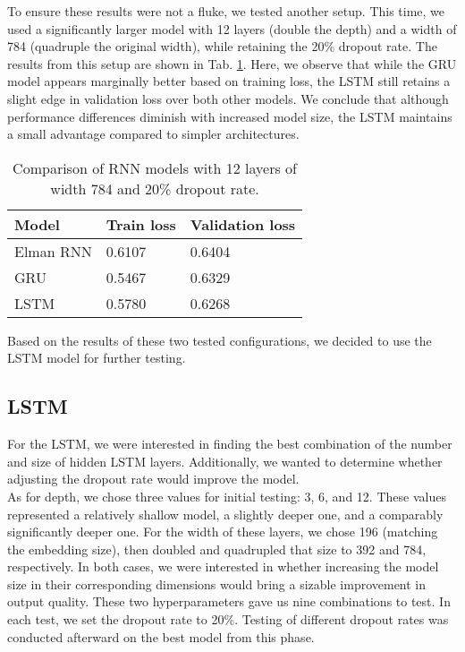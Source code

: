 To ensure these results were not a fluke, we tested another setup. This time, we used a significantly larger model with 12 layers (double the depth) and a width of 784 (quadruple the original width), while retaining the 20\% dropout rate. The results from this setup are shown in Tab. \ref{tab:rnn_comp_2}. Here, we observe that while the GRU model appears marginally better based on training loss, the LSTM still retains a slight edge in validation loss over both other models. We conclude that although performance differences diminish with increased model size, the LSTM maintains a small advantage compared to simpler architectures.
\\

\begin{table}[!h]
	\centering
	\begin{tabular}{|l|l|l|}
		\hline
		Model        & Train loss      & Validation loss \\ \hline
		Elman RNN    &  0.6107         & 0.6404          \\ \hline      
		GRU          &  0.5467         & 0.6329          \\ \hline           
		LSTM         &  0.5780         & 0.6268          \\ \hline
	\end{tabular}
	\caption{Comparison of RNN models with 12 layers of width 784 and 20\% dropout rate.}
	\label{tab:rnn_comp_2}
\end{table}

Based on the results of these two tested configurations, we decided to use the LSTM model for further testing.

\subsection{LSTM}

For the LSTM, we were interested in finding the best combination of the number and size of hidden LSTM layers. Additionally, we wanted to determine whether adjusting the dropout rate would improve the model.
\\

As for depth, we chose three values for initial testing: 3, 6, and 12. These values represented a relatively shallow model, a slightly deeper one, and a comparably significantly deeper one. For the width of these layers, we chose 196 (matching the embedding size), then doubled and quadrupled that size to 392 and 784, respectively. In both cases, we were interested in whether increasing the model size in their corresponding dimensions would bring a sizable improvement in output quality. These two hyperparameters gave us nine combinations to test. In each test, we set the dropout rate to 20\%. Testing of different dropout rates was conducted afterward on the best model from this phase.
\\

